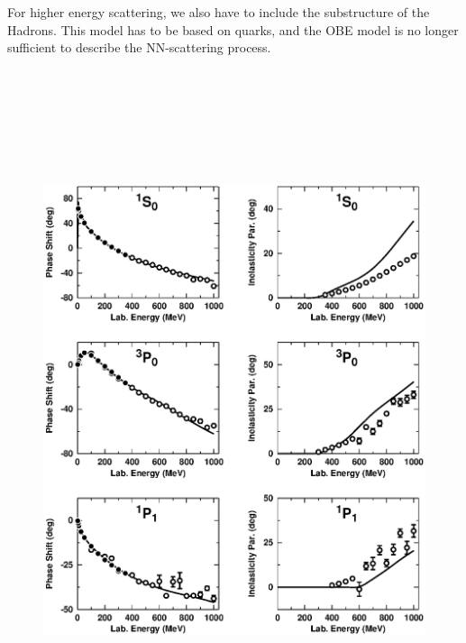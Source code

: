 

For higher energy scattering, we also have to include the substructure of the Hadrons. This model has to be based on quarks, 
and the OBE model is no longer sufficient to describe the NN-scattering process. 



\begin{flushleft} 
\begin{figure}%
\begin{flushleft} 
\includegraphics[height=20cm,width=18cm]{figd85_alt1.ps} 
\end{flushleft}  
\end{figure}
\end{flushleft}

